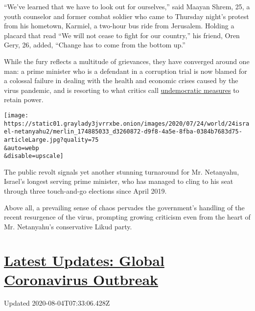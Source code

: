 ``We've learned that we have to look out for ourselves,'' said Maayan
Shrem, 25, a youth counselor and former combat soldier who came to
Thursday night's protest from his hometown, Karmiel, a two-hour bus ride
from Jerusalem. Holding a placard that read ``We will not cease to fight
for our country,'' his friend, Oren Gery, 26, added, ``Change has to
come from the bottom up.''

While the fury reflects a multitude of grievances, they have converged
around one man: a prime minister who is a defendant in a corruption
trial is now blamed for a colossal failure in dealing with the health
and economic crises caused by the virus pandemic, and is resorting to
what critics call
\href{https://www.nytimes3xbfgragh.onion/2020/03/18/world/middleeast/israel-virus-netanyahu.html?searchResultPosition=2}{undemocratic
measures} to retain power.

\texttt{[image: https://static01.graylady3jvrrxbe.onion/images/2020/07/24/world/24israel-netanyahu2/merlin\_174885033\_d3260872-d9f8-4a5e-8fba-0384b7683d75-articleLarge.jpg?quality=75\\\&auto=webp\\\&disable=upscale]}

The public revolt signals yet another stunning turnaround for Mr.
Netanyahu, Israel's longest serving prime minister, who has managed to
cling to his seat through three touch-and-go elections since April 2019.

Above all, a prevailing sense of chaos pervades the government's
handling of the recent resurgence of the virus, prompting growing
criticism even from the heart of Mr. Netanyahu's conservative Likud
party.

\hypertarget{latest-updates-global-coronavirus-outbreak}{%
\section{\texorpdfstring{\href{https://www.nytimes3xbfgragh.onion/2020/08/03/world/coronavirus-covid-19.html?action=click\&pgtype=Article\&state=default\&region=MAIN_CONTENT_1\&context=storylines_live_updates}{Latest
Updates: Global Coronavirus
Outbreak}}{Latest Updates: Global Coronavirus Outbreak}}\label{latest-updates-global-coronavirus-outbreak}}

Updated 2020-08-04T07:33:06.428Z

